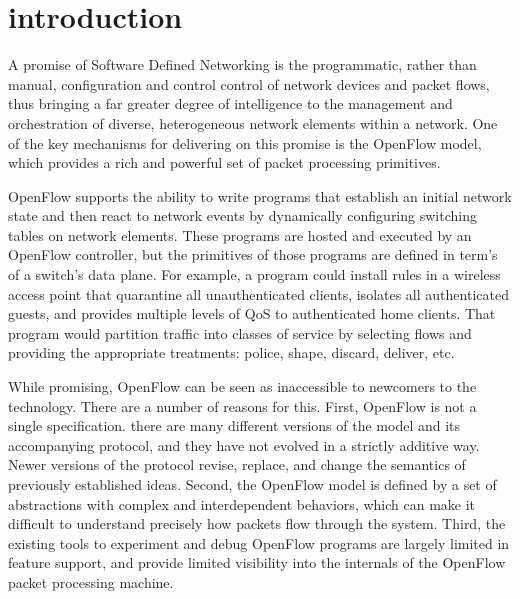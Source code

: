 
\section{introduction}
\label{sec:ref}

A promise of Software Defined Networking is the programmatic, rather
than manual, configuration and control control of network devices and packet 
flows, thus bringing a far greater degree of intelligence to the management and
orchestration of diverse, heterogeneous network elements within a
network. One of the key mechanisms for delivering on this promise is
the OpenFlow model, which provides a rich and powerful set of packet 
processing primitives.


OpenFlow supports the ability to write programs that establish an initial
network state and then react to network events by dynamically configuring 
switching tables on network elements. These programs are hosted and executed by 
an OpenFlow controller, but the primitives of those programs are
defined in term's of a switch's data plane. For example, a program could install
rules in a wireless access point that quarantine all unauthenticated clients, 
isolates all authenticated guests, and provides multiple levels of QoS to
authenticated home clients. That program would partition traffic into classes of
service by selecting flows and providing the appropriate treatments: police,
shape, discard, deliver, etc.


While promising, OpenFlow can be seen as inaccessible to newcomers to the 
technology. There are a number of reasons for this. First, OpenFlow is not a 
single specification. there are many different versions of the model and its 
accompanying protocol, and they have not evolved in a strictly additive way. 
Newer versions of the protocol revise, replace, and change the semantics of 
previously established ideas. Second, the OpenFlow model is defined by a set of 
abstractions with complex and interdependent behaviors, which can make it 
difficult to understand precisely how packets flow through the system.
Third, the existing tools to experiment and debug OpenFlow programs are 
largely limited in feature support, and provide limited visibility into the 
internals of the OpenFlow packet processing machine.

